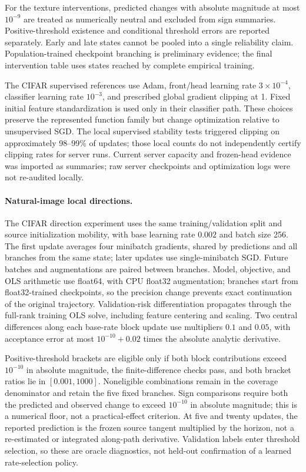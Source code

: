 For the texture interventions, predicted changes with absolute magnitude at most $10^{-9}$ are treated as numerically neutral and excluded from sign summaries. Positive-threshold existence and conditional threshold errors are reported separately. Early and late states cannot be pooled into a single reliability claim. Population-trained checkpoint branching is preliminary evidence; the final intervention table uses states reached by complete empirical training.

The CIFAR supervised references use Adam, front/head learning rate $3\times10^{-4}$, classifier learning rate $10^{-3}$, and prescribed global gradient clipping at 1. Fixed initial feature standardization is used only in their classifier path. These choices preserve the represented function family but change optimization relative to unsupervised SGD. The local supervised stability tests triggered clipping on approximately 98--99\% of updates; those local counts do not independently certify clipping rates for server runs. Current server capacity and frozen-head evidence was imported as summaries; raw server checkpoints and optimization logs were not re-audited locally.

\paragraph{Natural-image local directions.}
The CIFAR direction experiment uses the same training/validation split and source initialization mobility, with base learning rate $0.002$ and batch size 256. The first update averages four minibatch gradients, shared by predictions and all branches from the same state; later updates use single-minibatch SGD. Future batches and augmentations are paired between branches. Model, objective, and OLS arithmetic use float64, with CPU float32 augmentation; branches start from float32-trained checkpoints, so the precision change prevents exact continuation of the original trajectory. Validation-risk differentiation propagates through the full-rank training OLS solve, including feature centering and scaling. Two central differences along each base-rate block update use multipliers $0.1$ and $0.05$, with acceptance error at most $10^{-10}+0.02$ times the absolute analytic derivative.

Positive-threshold brackets are eligible only if both block contributions exceed $10^{-10}$ in absolute magnitude, the finite-difference checks pass, and both bracket ratios lie in $[0.001,1000]$. Noneligible combinations remain in the coverage denominator and retain the five fixed branches. Sign comparisons require both the predicted and observed change to exceed $10^{-10}$ in absolute magnitude; this is a numerical floor, not a practical-effect criterion. At five and twenty updates, the reported prediction is the frozen source tangent multiplied by the horizon, not a re-estimated or integrated along-path derivative. Validation labels enter threshold selection, so these are oracle diagnostics, not held-out confirmation of a learned rate-selection policy.

